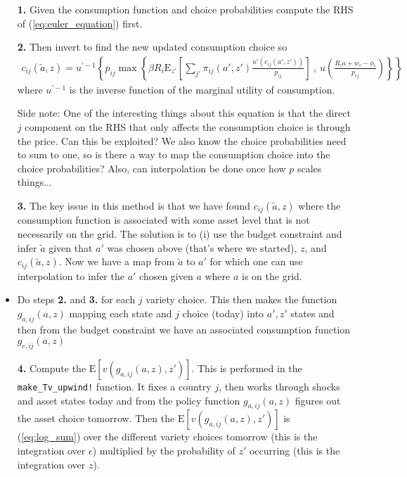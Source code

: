 \documentclass[12pt,pdftex]{article}
\begin{document}
\begin{onehalfspacing}
\begin{itemize}
\item[\textbf{1.}] Given the consumption function and choice probabilities compute the RHS of (\ref{eq:euler_equation}) first.

\item[\textbf{2.}] Then invert to find the new updated consumption choice so
\begin{align}
c_{ij}(\tilde a, z) = u^{' -1}\left\{ p_{ij} \max \left\{ \beta R_{i} \mathrm{E}_{z'} \left[ \sum_{j'} \pi_{ij}(a', z') \frac{u'(c_{ij}(a', z'))}{p_{ij}} \right] \ , \  u \left( \frac{R_i a + w_i - \phi_{i}}{p_{ij}} \right) \right \} \right \}
\end{align}
where $u^{' -1}$ is the inverse function of the marginal utility of consumption.

Side note: One of the interesting things about this equation is that the direct $j$ component on the RHS that only affects the consumption choice is through the price. Can this be exploited? We also know the choice probabilities need to sum to one, so is there a way to map the consumption choice into the choice probabilities? Also, can interpolation be done once how $p$ scales things...

\item[\textbf{3.}] The key issue in this method is that we have found  $c_{ij}(\tilde a, z)$ where the consumption function is associated with some asset level that is not necessarily on the grid. The solution is to (i) use the budget constraint and infer $\tilde a$ given that $a'$ was chosen above (that's where we started), $z$, and $c_{ij}(\tilde a, z)$. Now we have a map from $\tilde a$ to $a'$ for which one can use interpolation to infer the $a'$ chosen given $a$ where $a$ is on the grid.

\item Do steps \textbf{2.} and \textbf{3.} for each $j$ variety choice. This then makes the function $g_{a,ij}(a,z)$ mapping each state and $j$ choice (today) into $a', z'$ states and then from the budget constraint we have an associated consumption function $g_{c,ij}(a,z)$

\item[\textbf{4.}] Compute the $\mathrm{E}\left[ v(g_{a,ij}(a,z), z') \right]$. This is performed in the {\tt{make\_Tv\_upwind!}} function. It fixes a country $j$, then works through shocks and asset states today and from the policy function $g_{a,ij}(a,z)$ figures out the asset choice tomorrow. Then the $\mathrm{E}\left[ v(g_{a,ij}(a,z), z') \right]$ is (\ref{eq:log_sum}) over the different variety choices tomorrow (this is the integration over $\epsilon$) multiplied by the probability of $z'$ occurring (this is the integration over $z$).


\end{itemize}
\end{onehalfspacing}
\end{document}
